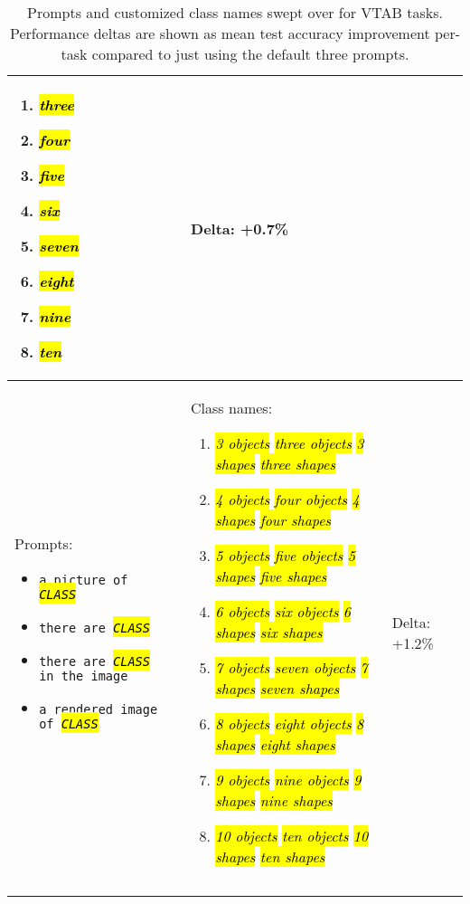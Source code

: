 \documentclass[10pt,twocolumn,letterpaper]{article}
\DeclareRobustCommand{\hlgrey}[1]{{\sethlcolor{light_gray}\hl{#1}}}
\newcommand{\clsfmt}[1]{\hlgrey{\textit{#1}}}
\def \cls {\clsfmt{CLASS}}
\begin{document}
\begin{longtable}[h]{p{}p{}p{}}
\small
\begin{enumerate}[itemsep=1pt,topsep=1pt,leftmargin=12pt]
	\item \clsfmt{three}
	\item \clsfmt{four}
	\item \clsfmt{five}
	\item \clsfmt{six}
	\item \clsfmt{seven}
	\item \clsfmt{eight}
	\item \clsfmt{nine}
	\item \clsfmt{ten}
\end{enumerate}
\normalsize
&
Delta: \small 
+0.7\%
\normalsize \\

\midrule


Prompts:
\small
\begin{itemize}[itemsep=1pt,topsep=1pt,leftmargin=12pt]
	\item \texttt{a picture of \cls~}
	\item \texttt{there are \cls~}
	\item \texttt{there are \cls~ in the image}
	\item \texttt{a rendered image of \cls~}
\end{itemize}
\normalsize &
Class names:

\small
\begin{enumerate}[itemsep=1pt,topsep=1pt,leftmargin=12pt]
	\item \clsfmt{ 3 objects}  \clsfmt{ three objects}  \clsfmt{ 3 shapes}  \clsfmt{ three shapes }
	\item \clsfmt{ 4 objects}  \clsfmt{ four objects}  \clsfmt{ 4 shapes}  \clsfmt{ four shapes }
	\item \clsfmt{ 5 objects}  \clsfmt{ five objects}  \clsfmt{ 5 shapes}  \clsfmt{ five shapes }
	\item \clsfmt{ 6 objects}  \clsfmt{ six objects}  \clsfmt{ 6 shapes}  \clsfmt{ six shapes }
	\item \clsfmt{ 7 objects}  \clsfmt{ seven objects}  \clsfmt{ 7 shapes}  \clsfmt{ seven shapes }
	\item \clsfmt{ 8 objects}  \clsfmt{ eight objects}  \clsfmt{ 8 shapes}  \clsfmt{ eight shapes }
	\item \clsfmt{ 9 objects}  \clsfmt{ nine objects}  \clsfmt{ 9 shapes}  \clsfmt{ nine shapes }
	\item \clsfmt{ 10 objects}  \clsfmt{ ten objects}  \clsfmt{ 10 shapes}  \clsfmt{ ten shapes }
\end{enumerate}
\normalsize
&
Delta: \small 
+1.2\%
\normalsize \\

\arrayrulecolor{black!100}\bottomrule
\\
\caption{\normalsize Prompts and customized class names swept over for VTAB tasks. Performance deltas are shown as mean test accuracy improvement per-task compared to just using the default three prompts.}
\label{tab:vtab_prompts_custom}
\end{longtable} \twocolumn
\end{document}
